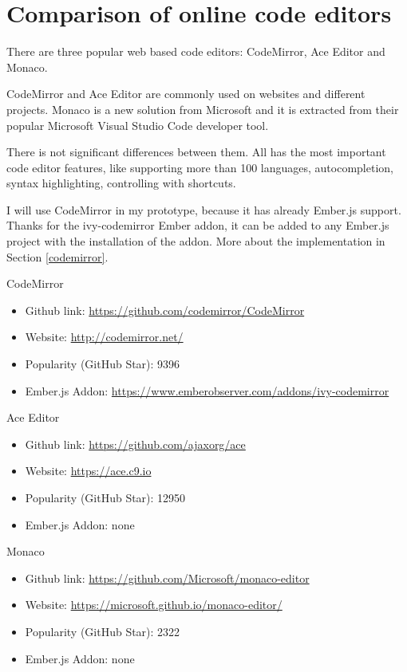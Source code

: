 \documentclass[12pt, a4paper, oneside, openright, medskipamount]{report}
\begin{document}
\section{Comparison of online code editors} \label{comparison}

There are three popular web based code editors: CodeMirror, Ace Editor and Monaco.

CodeMirror and Ace Editor are commonly used on websites and different projects. Monaco is a new solution from Microsoft and it is extracted from their popular Microsoft Visual Studio Code developer tool.

There is not significant differences between them. All has the most important code editor features, like supporting more than 100 languages, autocompletion, syntax highlighting, controlling with shortcuts.

I will use CodeMirror in my prototype, because it has already Ember.js support. Thanks for the ivy-codemirror Ember addon, it can be added to any Ember.js project with the installation of the addon. More about the implementation in Section \ref{codemirror}.

\noindent CodeMirror
\begin{itemize}[noitemsep]
\item Github link: \url{https://github.com/codemirror/CodeMirror}
\item Website: \url{http://codemirror.net/}
\item Popularity (GitHub Star): 9396
\item Ember.js Addon: \url{https://www.emberobserver.com/addons/ivy-codemirror}
\end{itemize}

\noindent Ace Editor
\begin{itemize}[noitemsep]
\item Github link: \url{https://github.com/ajaxorg/ace}
\item Website: \url{https://ace.c9.io}
\item Popularity (GitHub Star): 12950
\item Ember.js Addon: none
\end{itemize}

\noindent Monaco
\begin{itemize}[noitemsep]
\item Github link: \url{https://github.com/Microsoft/monaco-editor}
\item Website: \url{https://microsoft.github.io/monaco-editor/}
\item Popularity (GitHub Star): 2322
\item Ember.js Addon: none
\end{itemize}
\end{document}
